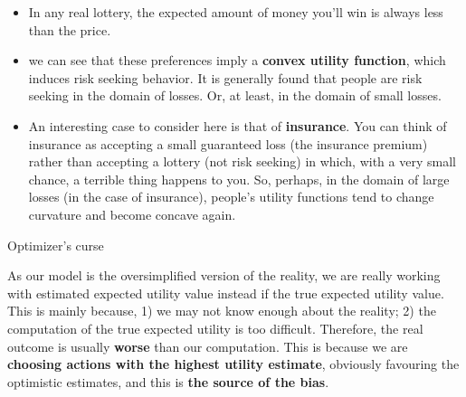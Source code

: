\documentclass[12pt]{article}
\begin{document}
\begin{tcolorbox}
\begin{itemize}
\item In any real lottery, the expected amount of money you'll win is always less
than the price. 
\item  we can see that these preferences
imply a \textbf{convex utility function}, which induces risk seeking behavior. It is
generally found that people are risk seeking in the domain of losses. Or, at
least, in the domain of small losses.
\item An interesting case to consider here is that of \textbf{insurance}. You can think of
insurance as accepting a small guaranteed loss (the insurance premium)
rather than accepting a lottery (not risk seeking) in which, with a very small chance, a terrible
thing happens to you. So, perhaps, in the domain of large losses (in the case of insurance), people's
utility functions tend to change curvature and become concave again.
\end{itemize}
\end{tcolorbox}

\noindent
{\large{Optimizer's curse}}\\


\begin{tcolorbox}
As our model is the oversimplified version of the reality, we are really working with estimated expected utility value instead if the true expected utility value. This is mainly because, 1) we may not know enough about the reality; 2) the computation of the true expected utility is too difficult. Therefore, the real outcome is usually \textbf{worse} than our computation. This is because we are \textbf{choosing actions with the highest utility estimate}, obviously favouring the optimistic estimates, and this is \textbf{the source of the bias}. \\
\end{tcolorbox}
\end{document}
